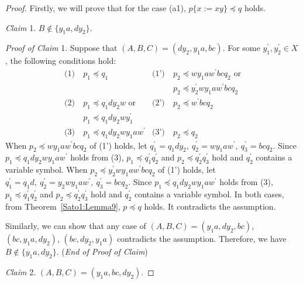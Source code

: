 \begin{proof}
  Firstly, we will prove that for the case (a1), $p \{ x := xy \} \preceq q$ holds.

  \smallskip

  \noindent
  \textit{Claim} 1. $B \not\in \{y_{1}a, dy_{2}\}$.

  \smallskip
  \noindent
  \textit{Proof of Claim} 1.
  Suppose that $(A, B, C) = (dy_{2}, y_{1}a, bc)$. For some $y_{1}^{\prime},y_{2}^{\prime}\in X$, the following conditions hold:
  \begin{align*}
    \textrm{(1)}~& p_{1} \preceq q_{1} & \textrm{(1')}~& p_{2} \preceq wy_{1}aw^{\prime}bcq_{2}\mbox{ or} \\
    & & & p_{2} \preceq y_{2}^{\prime}wy_{1}aw^{\prime}bcq_{2}\\
    \textrm{(2)}~& p_{1} \preceq q_{1}dy_{2}w\mbox{ or}  & \textrm{(2')}~& p_{2} \preceq w^{\prime}bcq_{2}\\
    & p_{1} \preceq q_{1}dy_{2}wy_{1}^{\prime} & & \\
    \textrm{(3)}~& p_{1} \preceq q_{1}dy_{2}wy_{1}aw^{\prime} & \textrm{(3')}~& p_{2} \preceq q_{2}
  \end{align*}
  When $p_{2} \preceq wy_{1}aw^{\prime}bcq_{2}$ of (1') holds, let $q^{\prime}_{1}=q_{1}dy_{2},~q^{\prime}_{2}=wy_{1}aw^{\prime},~q^{\prime}_{3}=bcq_{2}$. Since $p_{1} \preceq q_{1}dy_{2}wy_{1}aw^{\prime}$ holds from (3), $p_{1} \preceq q^{\prime}_{1}q^{\prime}_{2}$ and $p_{2} \preceq q^{\prime}_{2}q^{\prime}_{3}$ hold and $q_{2}^{\prime}$ contains a variable symbol.
  When $p_{2} \preceq y_{2}^{\prime}wy_{1}aw^{\prime}bcq_{2}$ of (1') holds, let $q^{\prime}_{1}=q_{1}d,~q^{\prime}_{2}=y_{2}wy_{1}aw^{\prime},~q^{\prime}_{3}=bcq_{2}$. Since $p_{1} \preceq q_{1}dy_{2}wy_{1}aw^{\prime}$ holds from (3), $p_{1} \preceq q^{\prime}_{1}q^{\prime}_{2}$ and $p_{2} \preceq q^{\prime}_{2}q^{\prime}_{3}$ hold and $q_{2}^{\prime}$ contains a variable symbol.
  In both cases, from Theorem~\ref{Sato1:Lemma9}, $p \preceq q$ holds. It contradicts the assumption.

  Similarly, we can show that any case of $(A, B, C) = (y_{1}a, dy_{2}, bc)$, $(bc, y_{1}a, dy_{2})$, $(bc, dy_{2}, y_{1}a)$ contradicts the assumption.
  Therefore, we have $B \not\in \{y_{1}a, dy_{2}\}$. (\textit{End of Proof of Claim})

  \smallskip

  \noindent
  \textit{Claim} 2. $(A, B, C) = (y_{1}a, bc, dy_{2})$.


\end{proof}
